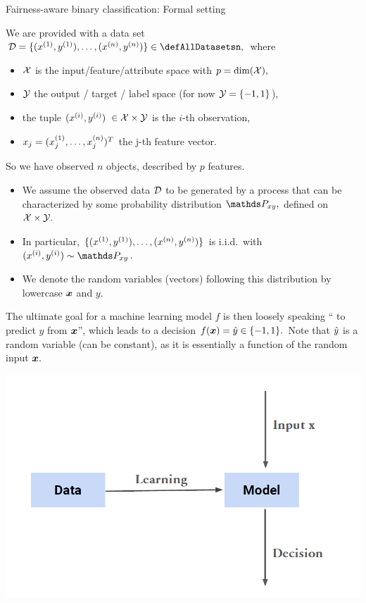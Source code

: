 \begin{vbframe}{Fairness-aware binary classification: Formal setting}
%	
\scriptsize{
%
We are provided with a data set 
%
$\D = \Dset \in \defAllDatasetsn,$
%
where 
%
\begin{itemize}
%	
	\item $\mathcal{X}$ is the input/feature/attribute space with $p = \text{dim}(\mathcal{X}),$ 
%	
	\item $\mathcal{Y}$ the output / target / label space (for now $\mathcal{Y} = \{-1,1\}$),
%	
	\item the tuple \((x^{(i)}, y^{(i)})\) $\in \mathcal{X}\times \mathcal{Y}$ is the \(i\)-th observation,
%	
	\item $x_j = (x^{(1)}_j, \ldots, x^{(n)}_j)^T$ the j-th feature vector.
%	
\end{itemize}
%
So we have observed $n$ objects, described by $p$ features.
%
\begin{itemize}
%	
	\item We assume the observed data $\mathcal{D}$ to be generated by a process that can
	be characterized by some probability distribution $\Pxy,$ defined on 
	$\mathcal{X} \times \mathcal{Y}.$
%	
	\item In particular, $\{ (x^{(1)}, y^{(1)}), \ldots, (x^{(n)}, y^{(n)})\}$ is i.i.d.\ with $\xyi\sim\Pxy $.
%	
	\item We denote the random variables (vectors) following this 
	distribution by lowercase $\bm{x}$ and $y$.
%	
\end{itemize}
%
\begin{minipage}{0.5\textwidth}
%	
	The ultimate goal for a machine learning model $f$ is then loosely speaking `` to predict $y$ from $\bm{x}$'', which leads to a decision $f(\bm{x}) = \hat{y} \in \{-1,1\}.$ Note that $\hat{y}$ is a random variable (can be constant), as it is essentially a function of the random input $\bm{x}.$
%	
\end{minipage}
\begin{minipage}{0.45\textwidth}
	\begin{center}
		\includegraphics[width=0.9\linewidth]{figure/ml_decision_process.png}
	\end{center}
\end{minipage}
}
\end{vbframe}

